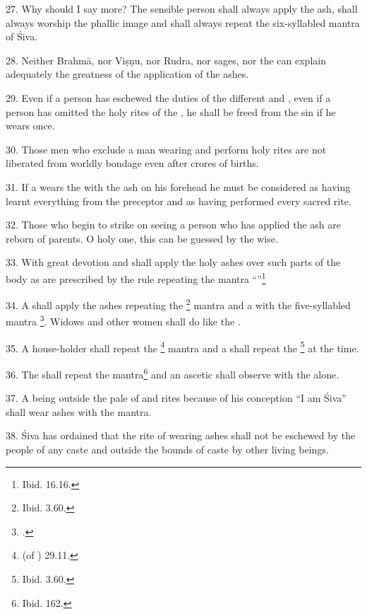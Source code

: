 27. Why should I say more? The sensible person shall always apply the ash, shall
always worship the phallic image and shall always repeat the six-syllabled
mantra of Śiva.

28. Neither Brahmā, nor Viṣṇu, nor Rudra, nor sages, nor the  can
explain adequately the greatness of the application of the ashes.

29. Even if a person has eschewed the duties of the different  and
, even if a person has omitted the holy rites of the ,
he shall be freed from the sin if he wears  once.

30. Those men who exclude a man wearing  and perform holy rites
are not liberated from worldly bondage even after crores of births.

31. If a  wears the  with the ash on his forehead he
must be considered as having learnt everything from the preceptor and as having
performed every sacred rite.

32. Those who begin to strike on seeing a person who has applied the ash are
reborn of  parents. O holy one, this can be guessed by the wise.

33. With great devotion  and  shall apply the holy
ashes over such parts of the body as are prescribed by the rule repeating
the mantra “”\footnote{Ibid. 16.16.} \etc

34. A  shall apply the ashes repeating the 
\footnote{Ibid. 3.60.} mantra and a  with the five-syllabled mantra
\footnote{.}. Widows and other women shall do like
the .

35. A house-holder shall repeat the 
\footnote{ (of ) 29.11.} mantra \etc
and a  shall repeat the 
\footnote{Ibid. 3.60.} at the time.

36. The  shall repeat the  mantra\footnote{Ibid. 162.}
and an ascetic shall observe with the  alone.

37. A  being outside the pale of  and  rites
because of his conception “I am Śiva” shall wear ashes with the  mantra.

38. Śiva has ordained that the rite of wearing ashes shall not be eschewed by
the people of any caste and outside the bounds of caste by other living beings.

